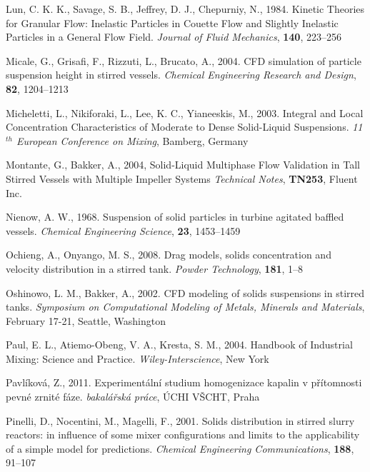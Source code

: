\begin{thebibliography}{99}
 Lun, C. K. K., Savage, S. B., Jeffrey, D. J., Chepurniy, N., 1984. Kinetic Theories for Granular Flow: Inelastic Particles in Couette Flow and Slightly Inelastic Particles in a General Flow Field. \textit{Journal of Fluid Mechanics}, \textbf{140}, 223--256 

 Micale, G., Grisafi, F., Rizzuti, L., Brucato, A., 2004. CFD simulation of particle suspension height in stirred vessels. \textit{Chemical Engineering Research and Design}, \textbf{82}, 1204--1213

 Micheletti, L., Nikiforaki, L., Lee, K. C., Yianeeskis, M., 2003. Integral and Local Concentration Characteristics of Moderate to Dense Solid-Liquid Suspensions. \textit{11$^{th}$ European Conference on Mixing}, Bamberg, Germany

 Montante, G., Bakker, A., 2004, Solid-Liquid Multiphase Flow Validation in Tall Stirred Vessels with Multiple Impeller Systems \textit{Technical Notes}, \textbf{TN253}, Fluent Inc.

 Nienow, A. W., 1968. Suspension of solid particles in turbine agitated baffled vessels. \textit{Chemical Engineering Science}, \textbf{23}, 1453--1459 

 Ochieng, A., Onyango, M. S., 2008. Drag models, solids concentration and velocity distribution in a stirred tank. \textit{Powder Technology}, \textbf{181}, 1--8

 Oshinowo, L. M., Bakker, A., 2002. CFD modeling of solids suspensions in stirred tanks. \textit{Symposium on Computational Modeling of Metals, Minerals and Materials}, February 17-21, Seattle, Washington 

 Paul, E. L., Atiemo-Obeng, V. A., Kresta, S. M., 2004. Handbook of Industrial Mixing: Science and Practice. \textit{Wiley-Interscience}, New York

 Pavlíková, Z., 2011. Experimentální studium homogenizace kapalin v přítomnosti pevné zrnité fáze. \textit{bakalářská práce}, ÚCHI VŠCHT, Praha 

 Pinelli, D., Nocentini, M., Magelli, F., 2001. Solids distribution in stirred slurry reactors: in influence of some mixer configurations and limits to the applicability of a simple model for predictions.
\textit{Chemical Engineering Communications}, \textbf{188}, 91--107


\end{thebibliography}
